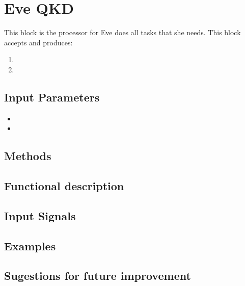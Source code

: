 \clearpage

\section{Eve QKD}

\maketitle
This block is the processor for Eve does all tasks that she needs. This block accepts and produces:

\begin{enumerate}
    \item
    \item
\end{enumerate}


\subsection*{Input Parameters}

	\begin{itemize}
		\item
		\item
		
	\end{itemize}

\subsection*{Methods}



\subsection*{Functional description}



\subsection*{Input Signals}


\subsection*{Examples}


\subsection*{Sugestions for future improvement}
